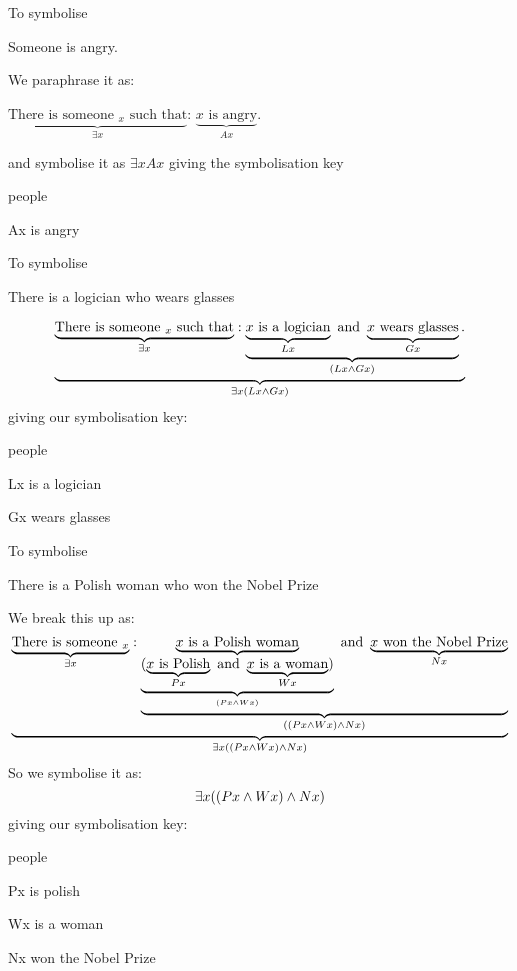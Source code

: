 To symbolise
\begin{earg}
\item[\ex{q.e}] Someone is angry.
\end{earg}
We paraphrase it as:
\begin{ebullet}
\item $\underbrace{\text{There is someone $_x$ such that}}_{\exists x}$: $\underbrace{\text{$x$ is angry}}_{Ax}$.
\end{ebullet}
and symbolise it as $\exists x Ax$ giving the symbolisation key
\begin{ekey}
\item[\text{domain}] people
\item[Ax] is angry
\end{ekey}


To symbolise
\begin{earg}
\item[\ex{q.e}] There is a logician who wears glasses
\end{earg}
$$\underbrace{\underbrace{\text{There is someone $_x$ such that}}_{\exists x}: \underbrace{\underbrace{\text{$x$ is a logician}}_{Lx}\text{ and }\underbrace{\text{$x$ wears glasses}}_{Gx}}_{(Lx\mathbin{\wedge} Gx)}.}_{\exists x(Lx\mathbin{\wedge} Gx)}$$
giving our symbolisation key:
\begin{ekey}
\item[\text{domain}] people
\item[Lx] is a logician
\item[Gx] wears glasses
\end{ekey}

To symbolise
\begin{earg}
\item[\ex{q.e}] There is a Polish woman who won the Nobel Prize
\end{earg}
We break this up as:
$$
\underbrace{
	\underbrace{\text{There is someone $_x$}}_{\exists x}:
	\underbrace{
		\underbrace{\text{$x$ is a Polish woman}}_{
			\underbrace{(\underbrace{\text{$x$ is Polish}}_{Px}
			\text{ and }
			\underbrace{\text{$x$ is a woman}}_{Wx}
			)}_{(Px\mathbin{\wedge} Wx)}
			}
		\text{ and }
		\underbrace{\text{$x$ won the Nobel Prize}}_{Nx}
	}_{((Px\mathbin{\wedge} Wx)\mathbin{\wedge} Nx)}
}_{\exists x((Px\mathbin{\wedge} Wx)\mathbin{\wedge} Nx)}
$$
So we symbolise it as:
$$\exists x((Px\mathbin{\wedge} Wx)\mathbin{\wedge} Nx)$$
giving our symbolisation key:
\begin{ekey}
\item[\text{domain}] people
\item[Px] is polish
\item[Wx] is a woman
\item[Nx] won the Nobel Prize
\end{ekey}


